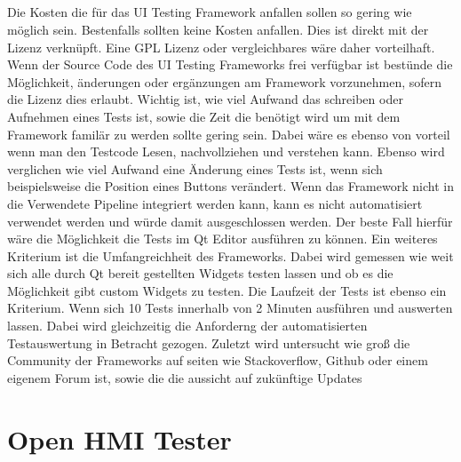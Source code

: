 		\FloatBarrier
		
		\paragraph{} Die Kosten die für das UI Testing Framework anfallen sollen so gering wie möglich sein. Bestenfalls sollten keine Kosten anfallen. Dies ist direkt mit der Lizenz verknüpft. Eine GPL Lizenz oder vergleichbares wäre daher vorteilhaft. Wenn der Source Code des UI Testing Frameworks frei verfügbar ist bestünde die Möglichkeit, änderungen oder ergänzungen am Framework vorzunehmen, sofern die Lizenz dies erlaubt. 
		Wichtig ist, wie viel Aufwand das schreiben oder Aufnehmen eines Tests ist, sowie die Zeit die benötigt wird um mit dem Framework familär zu werden sollte gering sein. Dabei wäre es ebenso von vorteil wenn man den Testcode Lesen, nachvollziehen und verstehen kann. Ebenso wird verglichen wie viel Aufwand eine Änderung eines Tests ist, wenn sich beispielsweise die Position eines Buttons verändert. Wenn das Framework nicht in die Verwendete Pipeline integriert werden kann, kann es nicht automatisiert verwendet werden und würde damit ausgeschlossen werden. Der beste Fall hierfür wäre die Möglichkeit die Tests im Qt Editor ausführen zu können. Ein weiteres Kriterium ist die Umfangreichheit des Frameworks. Dabei wird gemessen wie weit sich alle durch Qt bereit gestellten Widgets testen lassen und ob es die Möglichkeit gibt custom Widgets zu testen. Die Laufzeit der Tests ist ebenso ein Kriterium. Wenn sich 10 Tests innerhalb von 2 Minuten ausführen und auswerten lassen. Dabei wird gleichzeitig die Anforderng der automatisierten Testauswertung in Betracht gezogen. Zuletzt wird untersucht wie groß die Community der Frameworks auf seiten wie Stackoverflow, Github oder einem eigenem Forum ist, sowie die die aussicht auf zukünftige Updates
		

\chapter{Open HMI Tester}
		
